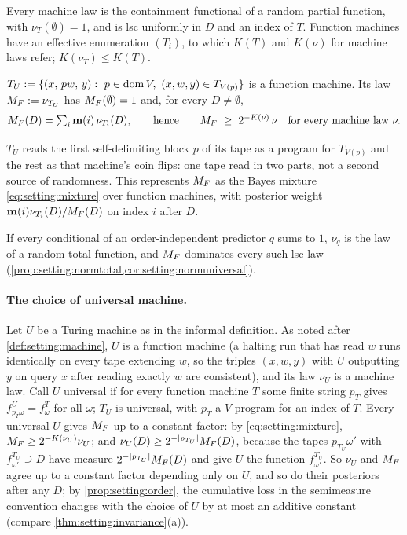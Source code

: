 \begin{proposition}\label{prop:setting:machinelaw}
Every machine law is the containment functional of a random partial function, with $\nu_T(\emptyset)=1$, and is lsc uniformly in $D$ and an index of $T$. Function machines have an effective enumeration $(T_i)$, to which $K(T)$ and $K(\nu)$ for machine laws refer; $K(\nu_T)\le K(T)$.
\end{proposition}

\begin{theorem}\label{thm:setting:universal}
$T_U:=\{(x,\,pw,\,y):\ p\in\operatorname{dom} V,\ (x,w,y)\in T_{V(p)}\}$ is a function machine. Its law $M_{F}:=\nu_{T_U}$ has $M_{F}(\emptyset)=1$ and, for every $D\ne\emptyset$,
\begin{equation}\label{eq:setting:mixture}
M_{F}(D)=\textstyle\sum_i\mathbf{m}(i)\,\nu_{T_i}(D),\qquad\text{hence}\qquad M_{F}\ \ge\ 2^{-K(\nu)}\,\nu\quad\text{for every machine law }\nu .
\end{equation}
\end{theorem}

$T_U$ reads the first self-delimiting block $p$ of its tape as a program for $T_{V(p)}$ and the rest as that machine's coin flips: one tape read in two parts, not a second source of randomness. This represents $M_{F}$ as the Bayes mixture \eqref{eq:setting:mixture} over function machines, with posterior weight $\mathbf{m}(i)\nu_{T_i}(D)/M_{F}(D)$ on index $i$ after $D$.

If every conditional of an order-independent predictor $q$ sums to $1$, $\nu_q$ is the law of a random total function, and $M_{F}$ dominates every such lsc law (\cref{prop:setting:normtotal,cor:setting:normuniversal}).

\paragraph{The choice of universal machine.} Let $U$ be a Turing machine as in the informal definition. As noted after \cref{def:setting:machine}, $U$ is a function machine (a halting run that has read $w$ runs identically on every tape extending $w$, so the triples $(x,w,y)$ with $U$ outputting $y$ on query $x$ after reading exactly $w$ are consistent), and its law $\nu_U$ is a machine law. Call $U$ universal if for every function machine $T$ some finite string $p_T$ gives $f^U_{p_T\omega}=f^T_\omega$ for all $\omega$; $T_U$ is universal, with $p_T$ a $V$-program for an index of $T$. Every universal $U$ gives $M_{F}$ up to a constant factor: by \eqref{eq:setting:mixture}, $M_{F}\ge2^{-K(\nu_U)}\nu_U$; and $\nu_U(D)\ge2^{-|p_{T_U}|}M_{F}(D)$, because the tapes $p_{T_U}\omega'$ with $f^{T_U}_{\omega'}\supseteq D$ have measure $2^{-|p_{T_U}|}M_{F}(D)$ and give $U$ the function $f^{T_U}_{\omega'}$. So $\nu_U$ and $M_{F}$ agree up to a constant factor depending only on $U$, and so do their posteriors after any $D$; by \cref{prop:setting:order}, the cumulative loss in the semimeasure convention changes with the choice of $U$ by at most an additive constant (compare \cref{thm:setting:invariance}(a)).

